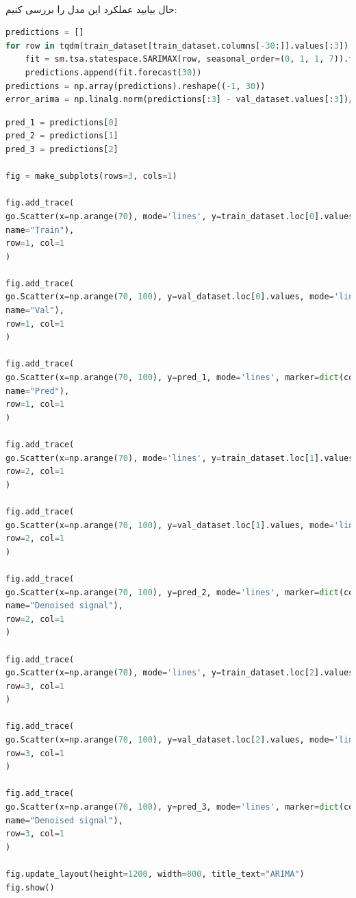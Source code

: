\documentclass{article}
\begin{document}
\ \\
حال بیایید عملکرد این مدل را بررسی کنیم:
\begin{latin}
\begin{lstlisting}[language=Python]
predictions = []
for row in tqdm(train_dataset[train_dataset.columns[-30:]].values[:3]):
	fit = sm.tsa.statespace.SARIMAX(row, seasonal_order=(0, 1, 1, 7)).fit()
	predictions.append(fit.forecast(30))
predictions = np.array(predictions).reshape((-1, 30))
error_arima = np.linalg.norm(predictions[:3] - val_dataset.values[:3])/len(predictions[0])
\end{lstlisting}
\end{latin}
\begin{latin}
\begin{lstlisting}[language=Python]
pred_1 = predictions[0]
pred_2 = predictions[1]
pred_3 = predictions[2]

fig = make_subplots(rows=3, cols=1)

fig.add_trace(
go.Scatter(x=np.arange(70), mode='lines', y=train_dataset.loc[0].values, marker=dict(color="dodgerblue"),
name="Train"),
row=1, col=1
)

fig.add_trace(
go.Scatter(x=np.arange(70, 100), y=val_dataset.loc[0].values, mode='lines', marker=dict(color="darkorange"),
name="Val"),
row=1, col=1
)

fig.add_trace(
go.Scatter(x=np.arange(70, 100), y=pred_1, mode='lines', marker=dict(color="seagreen"),
name="Pred"),
row=1, col=1
)

fig.add_trace(
go.Scatter(x=np.arange(70), mode='lines', y=train_dataset.loc[1].values, marker=dict(color="dodgerblue"), showlegend=False),
row=2, col=1
)

fig.add_trace(
go.Scatter(x=np.arange(70, 100), y=val_dataset.loc[1].values, mode='lines', marker=dict(color="darkorange"), showlegend=False),
row=2, col=1
)

fig.add_trace(
go.Scatter(x=np.arange(70, 100), y=pred_2, mode='lines', marker=dict(color="seagreen"), showlegend=False,
name="Denoised signal"),
row=2, col=1
)

fig.add_trace(
go.Scatter(x=np.arange(70), mode='lines', y=train_dataset.loc[2].values, marker=dict(color="dodgerblue"), showlegend=False),
row=3, col=1
)

fig.add_trace(
go.Scatter(x=np.arange(70, 100), y=val_dataset.loc[2].values, mode='lines', marker=dict(color="darkorange"), showlegend=False),
row=3, col=1
)

fig.add_trace(
go.Scatter(x=np.arange(70, 100), y=pred_3, mode='lines', marker=dict(color="seagreen"), showlegend=False,
name="Denoised signal"),
row=3, col=1
)

fig.update_layout(height=1200, width=800, title_text="ARIMA")
fig.show()
\end{lstlisting}
\end{latin}
\end{document}
